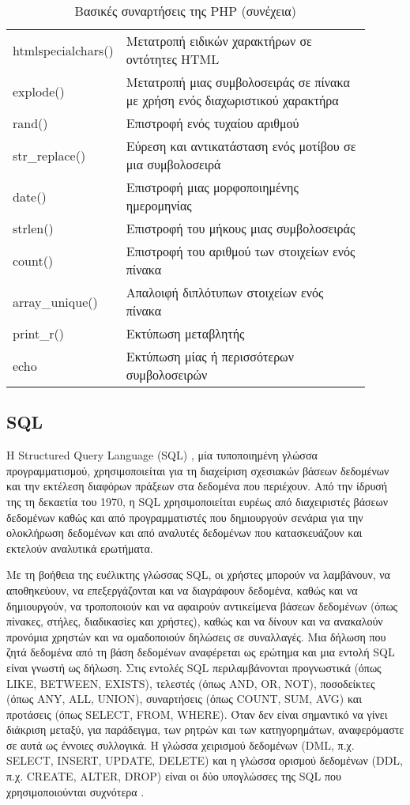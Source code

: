 \begin{longtable}{|p{0.2\linewidth}|p{0.7\linewidth}|} 
	\caption{Βασικές συναρτήσεις της PHP} \label{tbl:php_basic_functions} \\
	\hline
	\endfirsthead
	\caption[{}]{Βασικές συναρτήσεις της PHP (συνέχεια)} \\ 
	\endhead \endfoot 
	htmlspecialchars() & Μετατροπή ειδικών χαρακτήρων σε οντότητες HTML \\ \hline
	explode() & Μετατροπή μιας συμβολοσειράς σε πίνακα με χρήση ενός διαχωριστικού χαρακτήρα \\ \hline
	rand() & Επιστροφή ενός τυχαίου αριθμού \\ \hline
	str\_replace() & Εύρεση και αντικατάσταση ενός μοτίβου σε μια συμβολοσειρά \\ \hline
	date() & Επιστροφή μιας μορφοποιημένης ημερομηνίας \\ \hline
	strlen() & Επιστροφή του μήκους μιας συμβολοσειράς \\ \hline
	count() & Επιστροφή του αριθμού των στοιχείων ενός πίνακα \\ \hline
	array\_unique() & Απαλοιφή διπλότυπων στοιχείων ενός πίνακα \\ \hline
	print\_r() & Εκτύπωση μεταβλητής \\ \hline
	echo & Εκτύπωση μίας ή περισσότερων συμβολοσειρών \\ \hline
\end{longtable}

\subsection{SQL}
Η Structured Query Language (SQL) \cite{Loshin_2022}, μία τυποποιημένη γλώσσα προγραμματισμού, χρησιμοποιείται για τη διαχείριση σχεσιακών βάσεων δεδομένων και την εκτέλεση διαφόρων πράξεων στα δεδομένα που περιέχουν. Από την ίδρυσή της τη δεκαετία του 1970, η SQL χρησιμοποιείται ευρέως από διαχειριστές βάσεων δεδομένων καθώς και από προγραμματιστές που δημιουργούν σενάρια για την ολοκλήρωση δεδομένων και από αναλυτές δεδομένων που κατασκευάζουν και εκτελούν αναλυτικά ερωτήματα.

Με τη βοήθεια της ευέλικτης γλώσσας SQL, οι χρήστες μπορούν να λαμβάνουν, να αποθηκεύουν, να επεξεργάζονται και να διαγράφουν δεδομένα, καθώς και να δημιουργούν, να τροποποιούν και να αφαιρούν αντικείμενα βάσεων δεδομένων (όπως πίνακες, στήλες, διαδικασίες και χρήστες), καθώς και να δίνουν και να ανακαλούν προνόμια χρηστών και να ομαδοποιούν δηλώσεις σε συναλλαγές. Μια δήλωση που ζητά δεδομένα από τη βάση δεδομένων αναφέρεται ως ερώτημα και μια εντολή SQL είναι γνωστή ως δήλωση. Στις εντολές SQL περιλαμβάνονται προγνωστικά (όπως LIKE, BETWEEN, EXISTS), τελεστές (όπως AND, OR, NOT), ποσοδείκτες (όπως ANY, ALL, UNION), συναρτήσεις (όπως COUNT, SUM, AVG) και προτάσεις (όπως SELECT, FROM, WHERE). Όταν δεν είναι σημαντικό να γίνει διάκριση μεταξύ, για παράδειγμα, των ρητρών και των κατηγορημάτων, αναφερόμαστε σε αυτά ως έννοιες συλλογικά.
Η γλώσσα χειρισμού δεδομένων (DML, π.χ. SELECT, INSERT, UPDATE, DELETE) και η γλώσσα ορισμού δεδομένων (DDL, π.χ. CREATE, ALTER, DROP) είναι οι δύο υπογλώσσες της SQL που χρησιμοποιούνται συχνότερα \cite{taipalus2020sql}.
 
